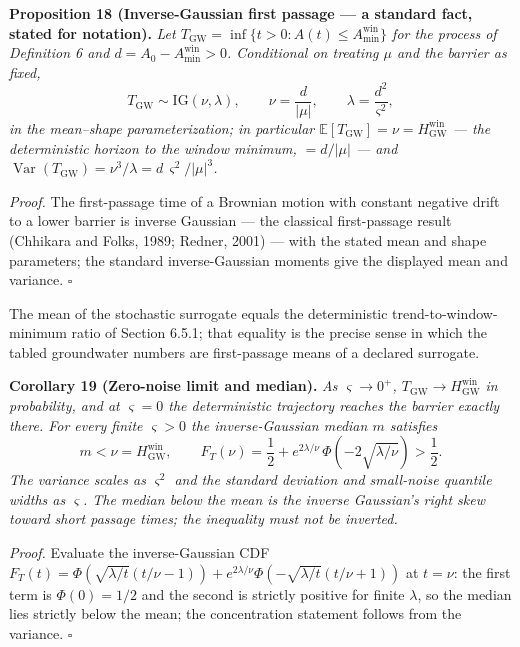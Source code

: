 \documentclass[11pt]{article}
\begin{document}
\textbf{Proposition 18 (Inverse-Gaussian first passage --- a standard
fact, stated for notation).} \emph{Let
\(T_{\mathrm{GW}} = \inf\{ t > 0 : A(t) \le A_{\min}^{\mathrm{win}} \}\)
for the process of Definition 6 and
\(d = A_0 - A_{\min}^{\mathrm{win}} > 0\). Conditional on treating
\(\mu\) and the barrier as fixed,}
\[T_{\mathrm{GW}} \sim \mathrm{IG}(\nu, \lambda), \qquad \nu = \frac{d}{|\mu|}, \qquad \lambda = \frac{d^2}{\varsigma^2},\]
\emph{in the mean--shape parameterization; in particular
\(\mathbb{E}[T_{\mathrm{GW}}] = \nu = H^{\mathrm{win}}_{\mathrm{GW}}\)
--- the deterministic horizon to the window minimum, \(= d/|\mu|\) ---
and
\(\operatorname{Var}(T_{\mathrm{GW}}) = \nu^3/\lambda = d\,\varsigma^2/|\mu|^3\).}

\emph{Proof.} The first-passage time of a Brownian motion with constant
negative drift to a lower barrier is inverse Gaussian --- the classical
first-passage result (Chhikara and Folks, 1989; Redner, 2001) --- with
the stated mean and shape parameters; the standard inverse-Gaussian
moments give the displayed mean and variance. \ensuremath{\square}

The mean of the stochastic surrogate equals the deterministic
trend-to-window-minimum ratio of Section 6.5.1; that equality is the
precise sense in which the tabled groundwater numbers are first-passage
means of a declared surrogate.

\textbf{Corollary 19 (Zero-noise limit and median).} \emph{As
\(\varsigma \to 0^+\),
\(T_{\mathrm{GW}} \to H^{\mathrm{win}}_{\mathrm{GW}}\) in probability,
and at \(\varsigma = 0\) the deterministic trajectory reaches the
barrier exactly there. For every finite \(\varsigma > 0\) the
inverse-Gaussian median \(m\) satisfies}
\[m < \nu = H^{\mathrm{win}}_{\mathrm{GW}}, \qquad F_T(\nu) = \frac{1}{2} + e^{2\lambda/\nu}\,\Phi\!\left( -2\sqrt{\lambda/\nu} \right) > \frac{1}{2}.\]
\emph{The variance scales as \(\varsigma^2\) and the standard deviation
and small-noise quantile widths as \(\varsigma\). The median below the
mean is the inverse Gaussian's right skew toward short passage times;
the inequality must not be inverted.}

\emph{Proof.} Evaluate the inverse-Gaussian CDF
\(F_T(t) = \Phi(\sqrt{\lambda/t}(t/\nu - 1)) + e^{2\lambda/\nu}\Phi(-\sqrt{\lambda/t}(t/\nu + 1))\)
at \(t = \nu\): the first term is \(\Phi(0) = 1/2\) and the second is
strictly positive for finite \(\lambda\), so the median lies strictly
below the mean; the concentration statement follows from the variance. \ensuremath{\square}
\end{document}
